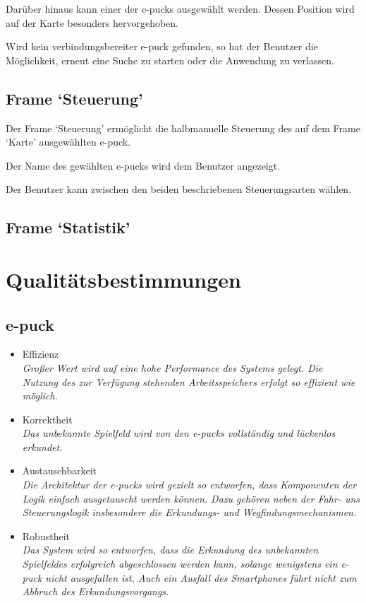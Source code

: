 \documentclass[10pt,a4paper]{article}
\begin{document}
			Darüber hinaus kann einer der e-pucks ausgewählt werden. Dessen Position wird auf der Karte besonders hervorgehoben.
			
			Wird kein verbindungsbereiter e-puck gefunden, so hat der Benutzer die Möglichkeit, erneut eine Suche zu starten oder die Anwendung
			zu verlassen.
			\subsection{Frame `Steuerung'}
			Der Frame `Steuerung' ermöglicht die halbmanuelle Steuerung des auf dem Frame `Karte' ausgewählten e-puck.
			
			Der Name des gewählten e-pucks wird dem Benutzer angezeigt.
			
			Der Benutzer kann zwischen den beiden beschriebenen Steuerungsarten wählen.
			\subsection{Frame `Statistik'}
	\section{Qualitätsbestimmungen}
		
		\subsection{e-puck}
			\begin{itemize}
				\item Effizienz
					\\ \textsl{Großer Wert wird auf eine hohe Performance des Systems gelegt. Die Nutzung des zur Verfügung stehenden
						Arbeitsspeichers erfolgt so effizient wie möglich.}
				\item Korrektheit
					\\ \textsl{Das unbekannte Spielfeld wird von den e-pucks vollständig und lückenlos erkundet.}
				\item Austauschbarkeit
					\\ \textsl{Die Architektur der e-pucks wird gezielt so entworfen, dass Komponenten der Logik einfach ausgetauscht
						werden können.
						Dazu gehören neben der Fahr- uns Steuerungslogik insbesondere die Erkundungs- und Wegfindungsmechanismen.}						
				\item Robustheit 
					\\ \textsl{Das System wird so entworfen, dass die Erkundung des unbekannten Spielfeldes erfolgreich abgeschlossen
						werden kann, solange wenigstens ein e-puck nicht ausgefallen ist.
						Auch ein Ausfall des Smartphones führt nicht zum Abbruch des Erkundungsvorgangs.
						}					
			\end{itemize}		
		
\end{document}
